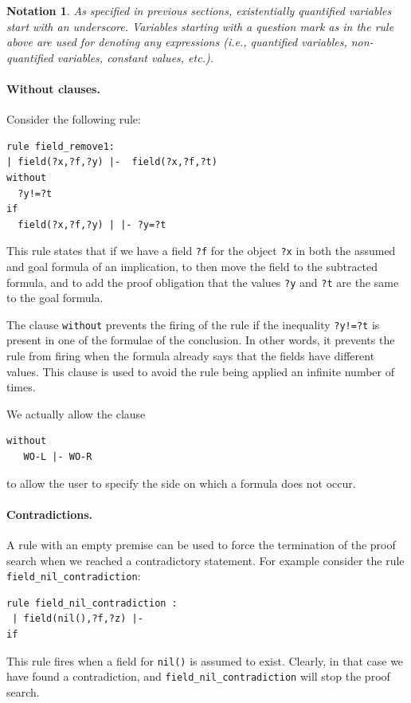 \documentclass[11pt]{article}
\newtheorem{notation}{Notation}
\begin{document}
\begin{notation}
 As specified in previous sections, existentially quantified variables
start with an underscore. Variables starting with a question mark as in the rule above are used for 
denoting any expressions (i.e., quantified variables, non-quantified variables, constant values, etc.). 
\end{notation}

\paragraph{Without clauses.}
Consider the following rule:
\begin{verbatim}
rule field_remove1:
| field(?x,?f,?y) |-  field(?x,?f,?t) 
without
  ?y!=?t 
if
  field(?x,?f,?y) | |- ?y=?t 
\end{verbatim}
This rule states that
if we have a field {\tt ?f} for the object {\tt ?x} in both the assumed and goal formula of an implication, to then move the 
 field to the subtracted formula, and to add the proof obligation that the values {\tt ?y} and {\tt ?t} are the same to the goal formula. 

The clause {\tt without} prevents the firing of the rule if the inequality {\tt ?y!=?t} is
present in one of the formulae of the conclusion. In other words, it prevents the rule from firing when the formula already says
that the fields have different values.  This clause is used to avoid the rule being applied
an infinite number of times.

We actually allow the clause 
\begin{verbatim}
without  
   WO-L |- WO-R
\end{verbatim}
to allow the user to specify the side on which a formula does not occur.

\paragraph{Contradictions.} 
A rule with an empty premise can be used to force the termination of the proof
search when we reached a contradictory statement.
%
For example consider the rule {\tt field\_nil\_contradiction}: 
\begin{verbatim}
rule field_nil_contradiction :
 | field(nil(),?f,?z) |-
if
\end{verbatim}
This rule fires when a field for {\tt nil()} is assumed to exist. Clearly, in that case
 we have found a contradiction, and {\tt field\_nil\_contradiction}  will stop the proof search.
\end{document}
